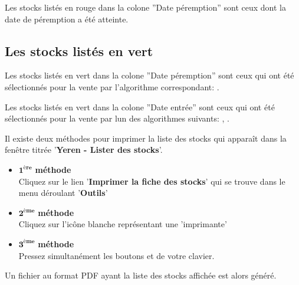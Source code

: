 Les stocks list\'es en \textcolor{firebrickred}{rouge} dans
la colone ''Date p\'eremption'' sont ceux dont la date de
p\'eremption a \'et\'e atteinte.

\subsection{Les stocks list\'es en vert}
Les stocks list\'es en \textcolor{medgreen}{vert} dans la
colone ''Date p\'eremption'' sont ceux qui ont \'et\'e
s\'electionn\'es pour la vente par l'algorithme correspondant:
\dpfdpo.

Les stocks list\'es en \textcolor{medgreen}{vert} dans la
colone ''Date entr\'ee'' sont ceux qui ont \'et\'e
s\'electionn\'es pour la vente par lun des algorithmes
suivants: \fifo, \lifo.


\newpage
{}\label{sec:imprimer-liste-stocks}

Il existe deux m\'ethodes pour imprimer la liste des
stocks qui appara\^it dans la fen\^etre titr\'ee
'\textbf{Yeren - Lister des stocks}'.

\begin{itemize}[]
	\item \textcolor{purplish}{$\mathbf{1^{\text{\`ere}}}$ \textbf{m\'ethode}}\\
		Cliquez sur le lien '\textbf{Imprimer la fiche des stocks}'
		qui se trouve dans le menu d\'eroulant '\textbf{Outils}'\\

	\item \textcolor{purplish}{$\mathbf{2^{\text{\`eme}}}$ \textbf{m\'ethode}}\\
		Cliquez sur l'ic\^one blanche repr\'esentant
		une 'imprimante'\\

	\item \textcolor{purplish}{$\mathbf{3^{\text{\`eme}}}$ \textbf{m\'ethode}}\\
		Pressez simultan\'ement les boutons 
		et  de votre clavier.\\
\end{itemize}

Un fichier au format PDF ayant la liste des stocks affich\'ee
est alors g\'en\'er\'e.

{}

